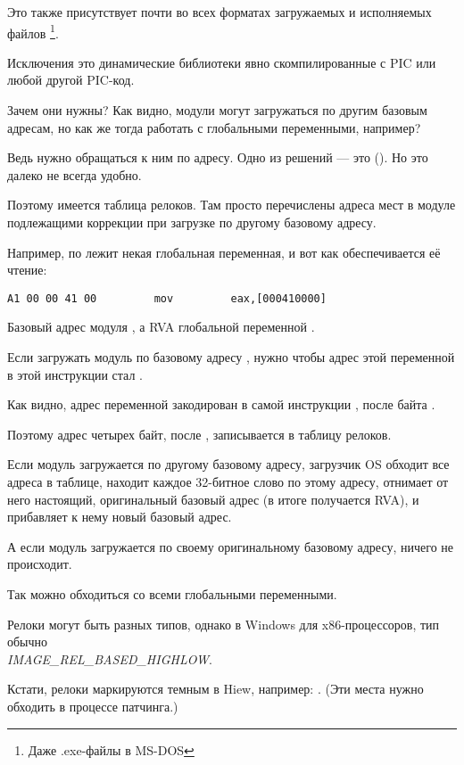 Это также присутствует почти во всех форматах загружаемых и исполняемых файлов
\footnote{Даже .exe-файлы в MS-DOS}.

Исключения это динамические библиотеки явно скомпилированные с \ac{PIC} или любой другой \ac{PIC}-код.

Зачем они нужны?
Как видно, модули могут загружаться по другим базовым адресам,
но как же тогда работать с глобальными переменными, например?

Ведь нужно обращаться к ним по адресу.
Одно из решений --- это \PICcode{} ().  Но это далеко не всегда удобно.

Поэтому имеется таблица релоков. 
Там просто перечислены адреса мест в модуле подлежащими коррекции при загрузке по другому базовому адресу.

Например, по  лежит некая глобальная переменная, и вот как обеспечивается её чтение:

\begin{lstlisting}[style=customasmx86]
A1 00 00 41 00         mov         eax,[000410000]
\end{lstlisting}

Базовый адрес модуля , а \ac{RVA} глобальной переменной .

Если загружать модуль по базовому адресу , нужно чтобы адрес этой переменной в этой инструкции стал .

Как видно, адрес переменной закодирован в самой инструкции , после байта .

Поэтому адрес четырех байт, после , записывается в таблицу релоков.

Если модуль загружается по другому базовому адресу,
загрузчик \ac{OS} обходит все адреса в таблице, 
находит каждое 32-битное слово по этому адресу,
отнимает от него настоящий, оригинальный базовый адрес
(в итоге получается \ac{RVA}), и прибавляет к нему новый базовый адрес.

А если модуль загружается по своему оригинальному базовому адресу, ничего не происходит.

Так можно обходиться со всеми глобальными переменными.

Релоки могут быть разных типов, однако в Windows для x86-процессоров, тип обычно \\
\emph{IMAGE\_REL\_BASED\_HIGHLOW}.

Кстати, релоки маркируются темным в Hiew, например: .
(Эти места нужно обходить в процессе патчинга.)

